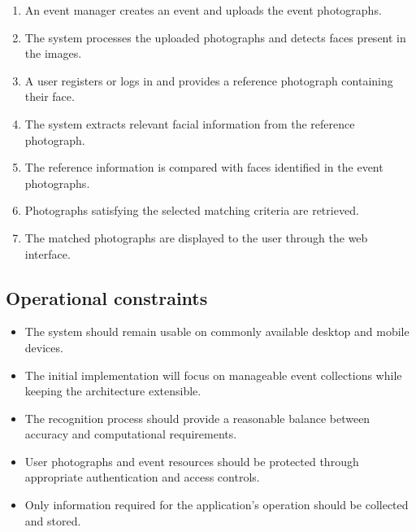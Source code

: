 \documentclass[11pt,a4paper]{article}
\begin{document}
\begin{enumerate}[leftmargin=0.7cm]

    \item An event manager creates an event and uploads the event
    photographs.

    \item The system processes the uploaded photographs and detects
    faces present in the images.

    \item A user registers or logs in and provides a reference
    photograph containing their face.

    \item The system extracts relevant facial information from the
    reference photograph.

    \item The reference information is compared with faces identified
    in the event photographs.

    \item Photographs satisfying the selected matching criteria are
    retrieved.

    \item The matched photographs are displayed to the user through
    the web interface.

\end{enumerate}

\subsection{Operational constraints}

\begin{itemize}[leftmargin=0.7cm]

    \item The system should remain usable on commonly available
    desktop and mobile devices.

    \item The initial implementation will focus on manageable event
    collections while keeping the architecture extensible.

    \item The recognition process should provide a reasonable balance
    between accuracy and computational requirements.

    \item User photographs and event resources should be protected
    through appropriate authentication and access controls.

    \item Only information required for the application's operation
    should be collected and stored.

\end{itemize}
\end{document}
